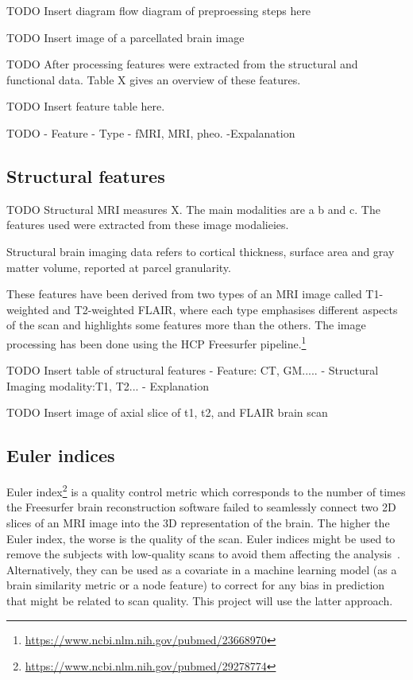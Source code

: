 TODO Insert diagram flow diagram of preproessing steps here

TODO Insert image of a parcellated brain image

TODO After processing features were extracted from the structural and functional data. Table X gives an overview of these features.

TODO Insert feature table here.

TODO - Feature
- Type - fMRI, MRI, pheo.
-Expalanation

\subsection{Structural features}
TODO Structural MRI measures X. The main modalities are a b and c. The features used were extracted from these image modalieies.

Structural brain imaging data refers to cortical thickness, surface area and gray matter volume, reported at parcel granularity.

These features have been derived from two types of an MRI image called T1-weighted and T2-weighted FLAIR, where each type emphasises different aspects of the scan and highlights some features more than the others. The image processing has been done using the HCP Freesurfer pipeline.\footnote{\url{https://www.ncbi.nlm.nih.gov/pubmed/23668970}} 

TODO Insert table of structural features
- Feature: CT, GM.....
- Structural Imaging modality:T1, T2...
- Explanation

TODO Insert image of axial slice of t1, t2, and FLAIR brain scan


\subsection{Euler indices}
Euler index\footnote{\url{https://www.ncbi.nlm.nih.gov/pubmed/29278774}} is a quality control metric which corresponds to the number of times the Freesurfer brain reconstruction software failed to seamlessly connect two 2D slices of an MRI image into the 3D representation of the brain. The higher the Euler index, the worse is the quality of the scan. Euler indices might be used to remove the subjects with low-quality scans to avoid them affecting the analysis~\cite{kaufmann2019}. Alternatively, they can be used as a covariate in a machine learning model (as a brain similarity metric or a node feature) to correct for any bias in prediction that might be related to scan quality. This project will use the latter approach.

